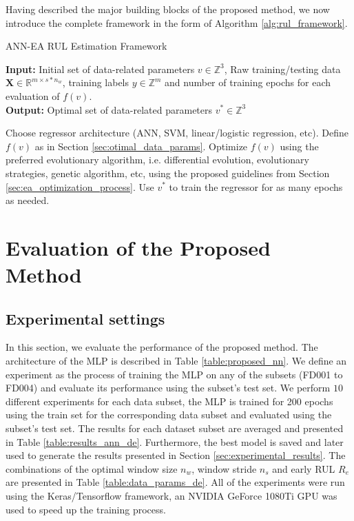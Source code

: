 \documentclass[preprint,12pt]{elsarticle}%
\begin{document}
Having described the major building blocks of the proposed method, we now
introduce the complete framework in the form of Algorithm \ref{alg:rul_framework}.

\setcounter{algorithm}{0} 
\begin{algorithm}[!htb]
\caption{\newline ANN-EA RUL Estimation Framework}\label{alg:rul_framework}
\textbf{Input:} Initial set of data-related parameters $v \in \mathbb{Z}^3$, 
Raw training/testing data $\mathbf{X} \in \mathbb{R}^{m \times s*n_w} $, training labels $y \in \mathbb{Z}^m$ and number of training epochs for each evaluation of $f(v)$.\\
\textbf{Output:} Optimal set of data-related parameters $v^* \in \mathbb{Z}^3$
\begin{algorithmic}[1]
\State Choose regressor architecture (ANN, SVM, linear/logistic regression, etc).
\State Define $f(v)$ as in Section \ref{sec:otimal_data_params}.
\State Optimize $f(v)$ using the preferred evolutionary algorithm, i.e. 
differential evolution, evolutionary strategies, genetic algorithm, etc, using the proposed 
guidelines from Section \ref{sec:ea_optimization_process}.
\State Use $v^*$ to train the regressor for as many epochs as needed.
\end{algorithmic}
\end{algorithm}


\section{Evaluation of the Proposed Method}

\label{sec:rul_eval}

\subsection{Experimental settings}

In this section, we evaluate the performance of the proposed method. The architecture of the MLP is described in Table \ref{table:proposed_nn}. We define an experiment as the process of training the MLP on any of the subsets (FD001 to FD004) and evaluate its performance using the subset's test set. We perform $10$ different experiments for each data subset, the MLP is trained for 200 epochs using the train set for the corresponding data subset and evaluated using the subset's test set. The results for each dataset subset are averaged and presented in Table \ref{table:results_ann_de}. Furthermore, the best model is saved and later used to generate the results presented in Section \ref{sec:experimental_results}.
The combinations of the optimal window size $n_{w}$, window stride $n_{s}$ and early RUL $R_{e}$ are presented in Table \ref{table:data_params_de}. All of the experiments were run using the Keras/Tensorflow framework, an NVIDIA GeForce 1080Ti GPU was used to speed up the training process.
\end{document}

